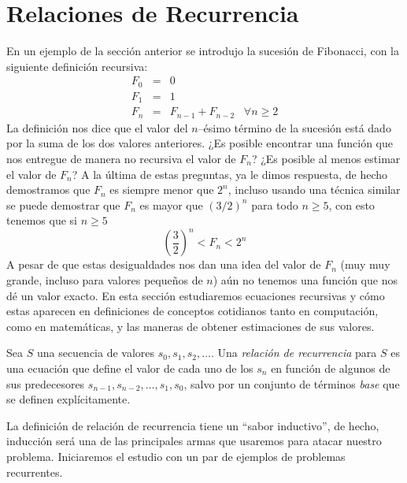 \section{Relaciones de Recurrencia}
En un ejemplo de la sección anterior se introdujo la sucesión de Fibonacci, con la siguiente definición recursiva:
\[
\begin{array}{rcl}
F_0 & = & 0 \\
F_1 & = & 1 \\
F_n & = & F_{n-1} + F_{n-2} \;\;\;\forall n\geq 2
\end{array}
\]
La definición nos dice que el valor del $n$--ésimo término de la sucesión está dado por la suma de los dos valores anteriores.
¿Es posible encontrar una función que nos entregue de manera no recursiva el valor de $F_n$?
¿Es posible al menos estimar el valor de $F_n$?
A la última de estas preguntas, ya le dimos respuesta, de hecho demostramos que $F_n$ es siempre menor que $2^n$, incluso usando una técnica similar se puede demostrar que $F_n$ es mayor que $(3/2)^n$ para todo $n\geq 5$, con esto tenemos que si $n\geq 5$
\[
\left(\frac{3}{2}\right)^n<F_n<2^n
\]
A pesar de que estas desigualdades nos dan una idea del valor de $F_n$ (muy muy grande, incluso para valores pequeños de $n$) aún no tenemos una función que nos dé un valor exacto.
En esta sección estudiaremos ecuaciones recursivas y cómo estas aparecen en definiciones de conceptos cotidianos tanto en computación, como en matemáticas, y las maneras de obtener estimaciones de sus valores.

\begin{definicion}
Sea $S$ una secuencia de valores $s_0,s_1,s_2,\ldots$. Una \emph{relación de recurrencia} para $S$ es una ecuación que define el valor de cada uno de los $s_n$ en función de algunos de sus predecesores $s_{n-1},s_{n-2},\ldots,s_1,s_0$, salvo por un conjunto de términos \emph{base} que se definen explícitamente.
\end{definicion}

La definición de relación de recurrencia tiene un ``sabor inductivo'', de hecho, inducción será una de las principales armas que usaremos para atacar nuestro problema.
Iniciaremos el estudio con un par de ejemplos de problemas recurrentes.

